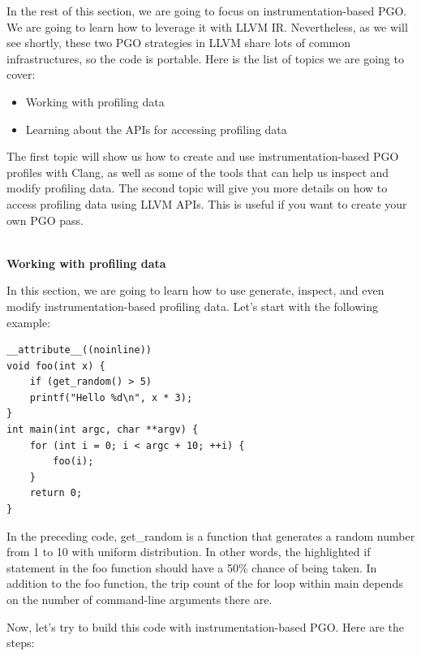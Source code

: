 In the rest of this section, we are going to focus on instrumentation-based PGO. We are going to learn how to leverage it with LLVM IR. Nevertheless, as we will see shortly, these two PGO strategies in LLVM share lots of common infrastructures, so the code is portable. Here is the list of topics we are going to cover:

\begin{itemize}
\item Working with profiling data
\item Learning about the APIs for accessing profiling data
\end{itemize}

The first topic will show us how to create and use instrumentation-based PGO profiles with Clang, as well as some of the tools that can help us inspect and modify profiling data. The second topic will give you more details on how to access profiling data using LLVM APIs. This is useful if you want to create your own PGO pass.

\hspace*{\fill} \\ %
\noindent
\textbf{Working with profiling data}

In this section, we are going to learn how to use generate, inspect, and even modify instrumentation-based profiling data. Let's start with the following example:

\begin{lstlisting}[style=styleCXX]
__attribute__((noinline))
void foo(int x) {
	if (get_random() > 5)
	printf("Hello %d\n", x * 3);
}
int main(int argc, char **argv) {
	for (int i = 0; i < argc + 10; ++i) {
		foo(i);
	}
	return 0;
}
\end{lstlisting}

In the preceding code, get\_random is a function that generates a random number from 1 to 10 with uniform distribution. In other words, the highlighted if statement in the foo function should have a 50\% chance of being taken. In addition to the foo function, the trip count of the for loop within main depends on the number of command-line arguments there are.

Now, let's try to build this code with instrumentation-based PGO. Here are the steps:

